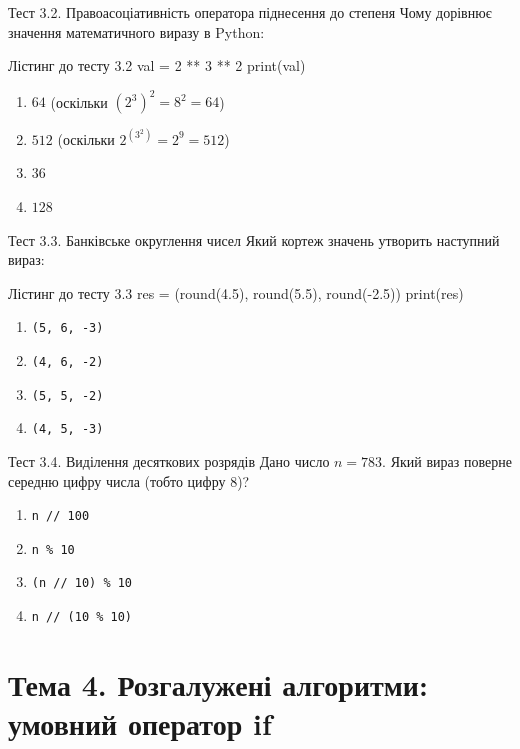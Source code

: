 \begin{pr}{Тест 3.2. Правоасоціативність оператора піднесення до степеня}
Чому дорівнює значення математичного виразу в Python:
\begin{py}{Лістинг до тесту 3.2}
val = 2 ** 3 ** 2
print(val)
\end{py}
\begin{enumerate}[label=\textbf{\Alph*.}]
	\item $64$ (оскільки $(2^3)^2 = 8^2 = 64$)
	\item $512$ (оскільки $2^{(3^2)} = 2^9 = 512$)
	\item $36$
	\item $128$
\end{enumerate}
\end{pr}

\begin{pr}{Тест 3.3. Банківське округлення чисел}
Який кортеж значень утворить наступний вираз:
\begin{py}{Лістинг до тесту 3.3}
res = (round(4.5), round(5.5), round(-2.5))
print(res)
\end{py}
\begin{enumerate}[label=\textbf{\Alph*.}]
	\item \texttt{(5, 6, -3)}
	\item \texttt{(4, 6, -2)}
	\item \texttt{(5, 5, -2)}
	\item \texttt{(4, 5, -3)}
\end{enumerate}
\end{pr}

\begin{pr}{Тест 3.4. Виділення десяткових розрядів}
Дано число $n = 783$. Який вираз поверне середню цифру числа (тобто цифру 8)?
\begin{enumerate}[label=\textbf{\Alph*.}]
	\item \texttt{n // 100}
	\item \texttt{n \% 10}
	\item \texttt{(n // 10) \% 10}
	\item \texttt{n // (10 \% 10)}
\end{enumerate}
\end{pr}

\section{Тема 4. Розгалужені алгоритми: умовний оператор if}

